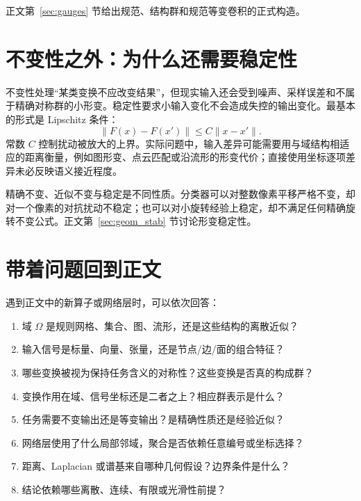 正文第~\ref{sec:gauges} 节给出规范、结构群和规范等变卷积的正式构造。

\section{不变性之外：为什么还需要稳定性}
\label{app:primer:stability}

不变性处理“某类变换不应改变结果”，但现实输入还会受到噪声、采样误差和不属于精确对称群的小形变。稳定性要求小输入变化不会造成失控的输出变化。最基本的形式是 Lipschitz 条件：
\begin{equation}
\lVert F(x)-F(x')\rVert
\leq C\lVert x-x'\rVert.
\label{app:primer:lipschitz}
\end{equation}
常数 $C$ 控制扰动被放大的上界。实际问题中，输入差异可能需要用与域结构相适应的距离衡量，例如图形变、点云匹配或沿流形的形变代价；直接使用坐标逐项差异未必反映语义接近程度。

精确不变、近似不变与稳定是不同性质。分类器可以对整数像素平移严格不变，却对一个像素的对抗扰动不稳定；也可以对小旋转经验上稳定，却不满足任何精确旋转不变公式。正文第~\ref{sec:geom_stab} 节讨论形变稳定性。

\section{带着问题回到正文}
\label{app:primer:reading-guide}

遇到正文中的新算子或网络层时，可以依次回答：

\begin{enumerate}
\item 域 $\Omega$ 是规则网格、集合、图、流形，还是这些结构的离散近似？
\item 输入信号是标量、向量、张量，还是节点/边/面的组合特征？
\item 哪些变换被视为保持任务含义的对称性？这些变换是否真的构成群？
\item 变换作用在域、信号坐标还是二者之上？相应群表示是什么？
\item 任务需要不变输出还是等变输出？是精确性质还是经验近似？
\item 网络层使用了什么局部邻域，聚合是否依赖任意编号或坐标选择？
\item 距离、Laplacian 或谱基来自哪种几何假设？边界条件是什么？
\item 结论依赖哪些离散、连续、有限或光滑性前提？
\end{enumerate}

